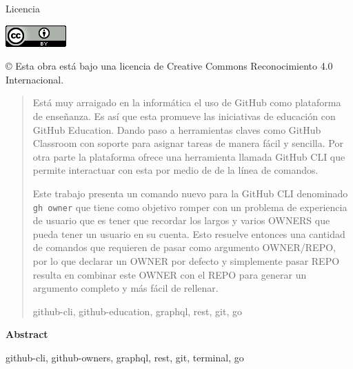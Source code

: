 \documentclass[spanish,a4paper,12pt,oneside]{extreport}
\newenvironment{summary}
{\par\noindent\begin{center}\textbf{Abstract}\end{center}\begin{itshape}\par\noindent}
{\end{itshape}}
\newenvironment{keywords}
{\begin{list}{}{\setlength{\leftmargin}{1em}}\item[\hskip\labelsep \bfseries Keywords:]}
{\end{list}}
\newenvironment{palabrasClave}
{\begin{list}{}{\setlength{\leftmargin}{1em}}\item[\hskip\labelsep \bfseries Palabras clave:]}
{\end{list}}
\begin{document}
\bigskip
\begin{LARGE}
Licencia
\end{LARGE}

\begin{center}
\includegraphics[scale=1.8]{images/by_88x31}\\[5mm]
\end{center}

\begin{large}
© Esta obra está bajo una licencia de Creative Commons Reconocimiento 4.0 Internacional.
\end{large}

\newpage 
\thispagestyle{empty}

\begin{abstract} %
Está muy arraigado en la informática el uso de GitHub como plataforma de enseñanza.
Es así que esta promueve las iniciativas de educación con GitHub Education. 
Dando paso a herramientas claves como GitHub Classroom con soporte para asignar tareas de manera fácil
y sencilla. Por otra parte la plataforma ofrece una herramienta llamada GitHub CLI que permite interactuar 
con esta por medio de  de la línea de comandos.

Este trabajo presenta un comando nuevo para la GitHub CLI 
denominado \verb|gh owner| que tiene como objetivo romper con un problema 
de experiencia de usuario que es tener que recordar los largos y varios OWNERS 
que pueda tener un usuario en su cuenta. Esto resuelve entonces una cantidad de comandos 
que requieren de pasar como argumento OWNER/REPO, por lo que declarar un OWNER por defecto y simplemente pasar REPO resulta en combinar este OWNER con el REPO para generar un argumento completo y más fácil de rellenar.
\begin{palabrasClave}
github-cli, github-education, graphql, rest, git, go
\end{palabrasClave}

\end{abstract}
\newpage 
\vspace*{200px}
\thispagestyle{empty}

\begin{summary} %
\begin {keywords}
github-cli, github-owners, graphql, rest, git, terminal, go
\end {keywords}

\end{summary}
\newpage{\pagestyle{empty}}
\thispagestyle{empty}
\end{document}

